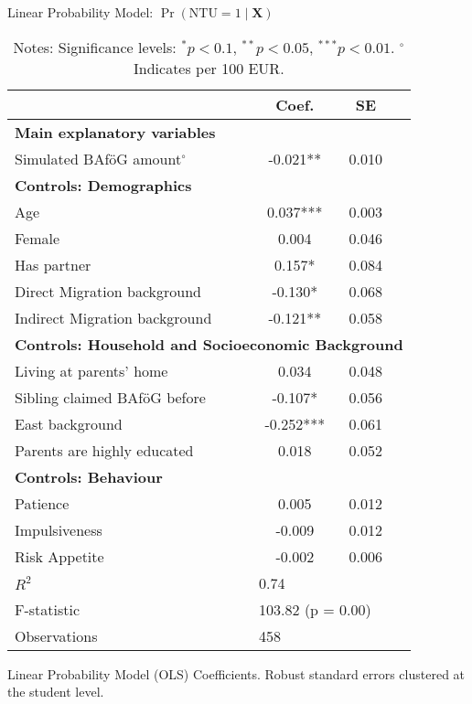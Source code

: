 \begin{table}
\caption{Linear Probability Model: $\Pr(\mathrm{NTU} = 1 \mid \mathbf{X})$}
\renewcommand{\arraystretch}{1.25}
\footnotesize
\centering
\begin{tabular}{lccc}
\toprule
 & Coef. & SE \\
\midrule
\multicolumn{4}{l}{\textbf{Main explanatory variables}} \\
Simulated BAföG amount$^{\circ}$ & -0.021** & 0.010 \\
\midrule
\multicolumn{4}{l}{\textbf{Controls: Demographics}} \\
Age & 0.037*** & 0.003 \\
Female & 0.004 & 0.046 \\
Has partner & 0.157* & 0.084 \\
Direct Migration background & -0.130* & 0.068 \\
Indirect Migration background & -0.121** & 0.058 \\
\midrule
\multicolumn{4}{l}{\textbf{Controls: Household and Socioeconomic Background}} \\
Living at parents’ home & 0.034 & 0.048 \\
Sibling claimed BAföG before & -0.107* & 0.056 \\
East background & -0.252*** & 0.061 \\
Parents are highly educated & 0.018 & 0.052 \\
\midrule
\multicolumn{4}{l}{\textbf{Controls: Behaviour}} \\
Patience & 0.005 & 0.012 \\
Impulsiveness & -0.009 & 0.012 \\
Risk Appetite & -0.002 & 0.006 \\
\midrule
$R^2$ & \multicolumn{3}{l}{0.74} \\
F-statistic & \multicolumn{3}{l}{103.82 (p = 0.00)} \\
Observations & \multicolumn{3}{l}{458} \\
\bottomrule
\end{tabular}
\caption*{Linear Probability Model (OLS) Coefficients. Robust standard errors clustered at the student level.}
\label{tab:lpm_results}
\caption*{\small{Notes: Significance levels: $^{{*}} p < 0.1$, $^{{**}} p < 0.05$, $^{{***}} p < 0.01$. $^\circ$ Indicates per 100 EUR.}}
\end{table}
